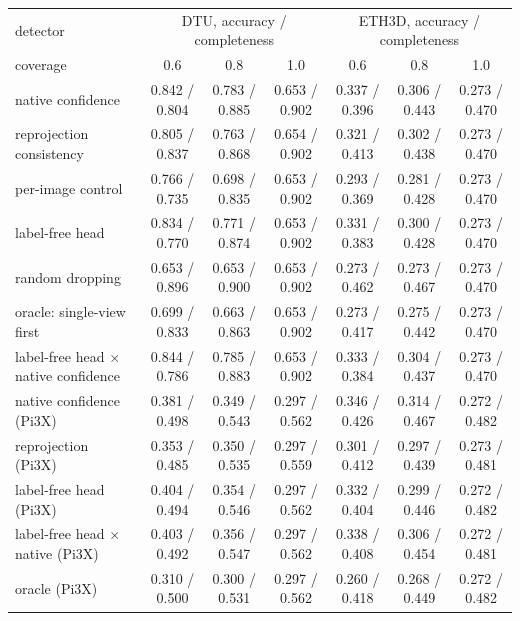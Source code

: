 \begin{tabular}{l*{6}{c}}
\toprule
detector & \multicolumn{3}{c}{DTU, accuracy / completeness} & \multicolumn{3}{c}{ETH3D, accuracy / completeness} \\
coverage & 0.6 & 0.8 & 1.0 & 0.6 & 0.8 & 1.0 \\
\midrule
native confidence & 0.842 / 0.804 & 0.783 / 0.885 & 0.653 / 0.902 & 0.337 / 0.396 & 0.306 / 0.443 & 0.273 / 0.470 \\
reprojection consistency & 0.805 / 0.837 & 0.763 / 0.868 & 0.654 / 0.902 & 0.321 / 0.413 & 0.302 / 0.438 & 0.273 / 0.470 \\
per-image control & 0.766 / 0.735 & 0.698 / 0.835 & 0.653 / 0.902 & 0.293 / 0.369 & 0.281 / 0.428 & 0.273 / 0.470 \\
label-free head & 0.834 / 0.770 & 0.771 / 0.874 & 0.653 / 0.902 & 0.331 / 0.383 & 0.300 / 0.428 & 0.273 / 0.470 \\
random dropping & 0.653 / 0.896 & 0.653 / 0.900 & 0.653 / 0.902 & 0.273 / 0.462 & 0.273 / 0.467 & 0.273 / 0.470 \\
oracle: single-view first & 0.699 / 0.833 & 0.663 / 0.863 & 0.653 / 0.902 & 0.273 / 0.417 & 0.275 / 0.442 & 0.273 / 0.470 \\
label-free head $\times$ native confidence & 0.844 / 0.786 & 0.785 / 0.883 & 0.653 / 0.902 & 0.333 / 0.384 & 0.304 / 0.437 & 0.273 / 0.470 \\
native confidence (Pi3X) & 0.381 / 0.498 & 0.349 / 0.543 & 0.297 / 0.562 & 0.346 / 0.426 & 0.314 / 0.467 & 0.272 / 0.482 \\
reprojection (Pi3X) & 0.353 / 0.485 & 0.350 / 0.535 & 0.297 / 0.559 & 0.301 / 0.412 & 0.297 / 0.439 & 0.273 / 0.481 \\
label-free head (Pi3X) & 0.404 / 0.494 & 0.354 / 0.546 & 0.297 / 0.562 & 0.332 / 0.404 & 0.299 / 0.446 & 0.272 / 0.482 \\
label-free head $\times$ native (Pi3X) & 0.403 / 0.492 & 0.356 / 0.547 & 0.297 / 0.562 & 0.338 / 0.408 & 0.306 / 0.454 & 0.272 / 0.481 \\
oracle (Pi3X) & 0.310 / 0.500 & 0.300 / 0.531 & 0.297 / 0.562 & 0.260 / 0.418 & 0.268 / 0.449 & 0.272 / 0.482 \\
\bottomrule
\end{tabular}
